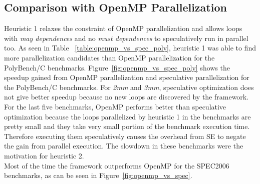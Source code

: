 \documentclass[10pt]{report}          %
\begin{document}
\subsection{Comparison with OpenMP Parallelization}

Heuristic 1 relaxes the constraint of OpenMP parallelization and allows loops with \textit{may dependences} and no \textit{must dependences} to speculatively run in parallel too.  As seen in Table ~\ref{table:openmp_vs_spec_poly}, heuristic 1 was able to find more parallelization candidates than OpenMP parallelization for the PolyBench/C benchmarks.  Figure~\ref{fig:openmp_vs_spec_poly} shows the speedup gained from OpenMP parallelization and speculative parallelization for the PolyBench/C benchmarks.  For \textit{2mm} and \textit{3mm}, speculative optimization does not give better speedup because no new loops are discovered by the framework.  For the last five benchmarks, OpenMP performs better than speculative optimization because the loops parallelized by heuristic 1 in the benchmarks are pretty small and they take very small portion of the benchmark execution time.  Therefore executing them speculatively causes the overhead from SE to negate the gain from parallel execution.  The slowdown in these benchmarks were the motivation for heuristic 2.\\

Most of the time the framework outperforms OpenMP for the SPEC2006 benchmarks, as can be seen in Figure~\ref{fig:openmp_vs_spec}.
\end{document}
